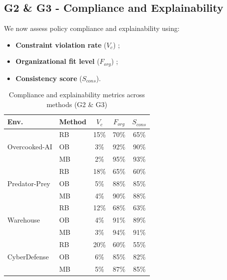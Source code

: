 \documentclass[pdflatex,sn-mathphys-num]{sn-jnl}%
\theoremstyle{thmstyleone}%
\theoremstyle{thmstyletwo}%
\theoremstyle{thmstylethree}%
\begin{document}
\subsection{G2 \& G3 - Compliance and Explainability}

We now assess policy compliance and explainability using:

\begin{itemize}
    \item \textbf{Constraint violation rate} ($V_c$) ;
    \item \textbf{Organizational fit level} ($F_{org}$) ;
    \item \textbf{Consistency score} ($S_{cons}$).
\end{itemize}

\begin{table}[h!]
    \centering
    \caption{Compliance and explainability metrics across methods (G2 \& G3)}
    \begin{tabular}{l|l|ccc}
        \hline
        \textbf{Env.} & \textbf{Method} & $V_c$ & $F_{org}$ & $S_{cons}$ \\
        \hline
        \multirow{3}{*}{Overcooked-AI}
                      & RB              & 15\%  & 70\%      & 65\%       \\
                      & OB              & 3\%   & 92\%      & 90\%       \\
                      & MB              & 2\%   & 95\%      & 93\%       \\
        \hline
        \multirow{3}{*}{Predator-Prey}
                      & RB              & 18\%  & 65\%      & 60\%       \\
                      & OB              & 5\%   & 88\%      & 85\%       \\
                      & MB              & 4\%   & 90\%      & 88\%       \\
        \hline
        \multirow{3}{*}{Warehouse}
                      & RB              & 12\%  & 68\%      & 63\%       \\
                      & OB              & 4\%   & 91\%      & 89\%       \\
                      & MB              & 3\%   & 94\%      & 91\%       \\
        \hline
        \multirow{3}{*}{CyberDefense}
                      & RB              & 20\%  & 60\%      & 55\%       \\
                      & OB              & 6\%   & 85\%      & 82\%       \\
                      & MB              & 5\%   & 87\%      & 85\%       \\
        \hline
    \end{tabular}
    \label{tab:g2_g3_full}
\end{table}
\end{document}
